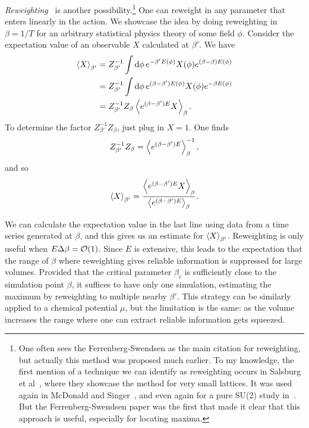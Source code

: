 {\it Reweighting}~\cite{ferrenberg_new_1989}
is another possibility.\footnote{One often sees the Ferrenberg-Swendsen as the
main citation for reweighting, but actually this method was proposed much
earlier. To my knowledge, the first mention of a technique we can identify as
reweighting occurs in Salsburg et al~\cite{salsburg_application_1959}, where
they showcase the method for very small lattices. It was used again in
McDonald and Singer~\cite{mcdonald_calculation_1967}, and even again for
a pure SU(2) study in~\cite{falcioni_complex_1982}. But the Ferrenberg-Swendsen
paper was the first that made it clear that this approach is useful, especially
for locating maxima.} One can reweight in any parameter that
enters linearly in the action. 
We showcase the idea by doing reweighting in $\beta=1/T$ for
an arbitrary statistical physics theory of some field $\phi$. Consider
the expectation value of an observable $X$ calculated at $\beta'$. We have
\begin{equation}
\begin{aligned}
  \ev{X}_{\beta'}&=Z_{\beta'}^{-1}\int\dd{\phi}e^{-\beta'E(\phi)}X(\phi)
                  e^{(\beta-\beta)E(\phi)}\\
                 &=Z_{\beta'}^{-1}\int\dd{\phi}e^{(\beta-\beta')E(\phi)}
                  X(\phi)e^{-\beta E(\phi)}\\
                 &=Z_{\beta'}^{-1}Z_{\beta}\ev{e^{(\beta-\beta')E}X}_\beta.
\end{aligned}
\end{equation}
To determine the factor $Z_{\beta'}^{-1}Z_{\beta}$, just plug in $X=1$.
One finds
\begin{equation}
Z_{\beta'}^{-1}Z_{\beta}=\ev{e^{(\beta-\beta')E}}_{\beta}^{-1},
\end{equation}
and so
\begin{equation}\label{eq:RW}
\ev{X}_{\beta'}=\frac{\ev{e^{(\beta-\beta')E}X}_\beta}{\ev{e^{(\beta-\beta')E}}_{\beta}}.
\end{equation}


We can calculate the expectation value in the last line
using data from a time series generated at $\beta$, and this gives us an
estimate for $\ev{X}_{\beta'}$. Reweighting is only useful when
$E\Delta\beta=\order{1}$. Since $E$ is extensive, this leads to the
expectation that the range of $\beta$ where reweighting gives reliable
information is suppressed for large volumes. 
Provided that the critical parameter $\beta_c$
is sufficiently close to the simulation point $\beta$, it suffices
to have only one simulation, estimating the maximum by reweighting to
multiple nearby $\beta'$. This strategy can be similarly applied
to a chemical potential $\mu$, but the limitation is the same: as
the volume increases the range where one can extract reliable
information gets squeezed.

